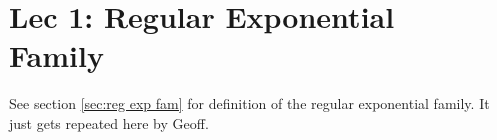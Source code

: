 \chapter[Lec 1: Regular Exponential Family]{Lec 1: Regular Exponential\\ Family}


See section \ref{sec:reg exp fam} for definition of the regular exponential family. 
It just gets repeated here by Geoff.






